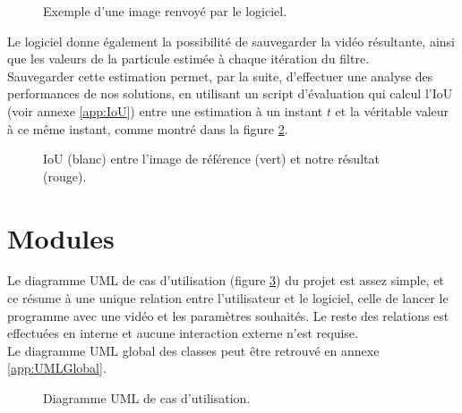 \begin{figure}[!htbp]
\center
\caption{Exemple d'une image renvoyé par le logiciel.}
\label{fig:soft_result}
\end{figure}
\FloatBarrier

Le logiciel donne également la possibilité de sauvegarder la vidéo résultante, ainsi que les valeurs de la particule estimée à chaque itération du filtre.\\
Sauvegarder cette estimation permet, par la suite, d'effectuer une analyse des performances de nos solutions, en utilisant un script d'évaluation qui calcul l'IoU (voir annexe \ref{app:IoU}) entre une estimation à un instant $t$ et la véritable valeur à ce même instant, comme montré dans la figure \ref{fig:eval_result}.\\

\begin{figure}[!htbp]
\center
\caption{IoU (blanc) entre l'image de référence (vert) et notre résultat (rouge).}
\label{fig:eval_result}
\end{figure}
\FloatBarrier


\clearpage
\section{Modules}
Le diagramme UML de cas d'utilisation (figure \ref{fig:uml_diagram_usecase}) du projet est assez simple, et ce résume à une unique relation entre l'utilisateur et le logiciel, celle de lancer le programme avec une vidéo et les paramètres souhaités. Le reste des relations est effectuées en interne et aucune interaction externe n'est requise.\\
Le diagramme UML global des classes peut être retrouvé en annexe \ref{app:UMLGlobal}.

\begin{figure}[!htbp]
\center
\caption{Diagramme UML de cas d'utilisation.}
\label{fig:uml_diagram_usecase}
\end{figure}
\FloatBarrier


